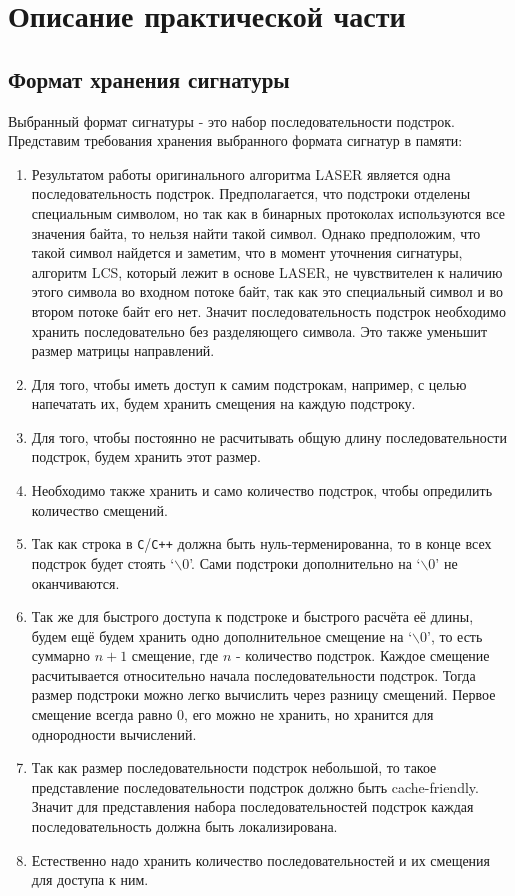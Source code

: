 \section{Описание практической части}
\label{sec:Section4} 

\subsection{Формат хранения сигнатуры}

Выбранный формат сигнатуры - это набор последовательности подстрок. Представим требования хранения выбранного формата сигнатур в памяти:

\begin{enumerate}
    \item Результатом работы оригинального алгоритма LASER является одна последовательность подстрок.
    Предполагается, что подстроки отделены специальным символом, но так как в бинарных протоколах используются все значения байта, то
    нельзя найти такой символ. Однако предположим, что такой символ найдется и заметим, что в момент уточнения сигнатуры, алгоритм LCS, который лежит в основе LASER,
    не чувствителен к наличию этого символа во входном потоке байт, так как это специальный символ и во втором потоке байт его нет.
    Значит последовательность подстрок необходимо хранить последовательно без разделяющего символа. Это также уменьшит размер матрицы направлений.
    \item Для того, чтобы иметь доступ к самим подстрокам, например, с целью напечатать их, будем хранить смещения на каждую подстроку.
    \item Для того, чтобы постоянно не расчитывать общую длину последовательности подстрок, будем хранить этот размер.
    \item Необходимо также хранить и само количество подстрок, чтобы опредилить количество смещений.
    \item Так как строка в \verb!C!/\verb!C++! должна быть нуль-терменированна, то в конце всех подстрок будет стоять  `$\backslash 0$'.
    Сами подстроки дополнительно на `$\backslash 0$' не оканчиваются.
    \item Так же для быстрого доступа к подстроке и быстрого расчёта её длины, будем ещё будем хранить одно дополнительное смещение на `$\backslash 0$',
    то есть суммарно $n + 1$ смещение, где $n$ - количество подстрок. Каждое смещение расчитывается относительно начала последовательности подстрок.
    Тогда размер подстроки можно легко вычислить через разницу смещений. Первое смещение всегда равно 0, его можно не хранить, но хранится для однородности вычислений.
    \item Так как размер последовательности подстрок небольшой, то такое представление последовательности подстрок должно быть cache-friendly.
    Значит для представления набора последовательностей подстрок каждая последовательность должна быть локализирована.
    \item Естественно надо хранить количество последовательностей и их смещения для доступа к ним.
\end{enumerate}



